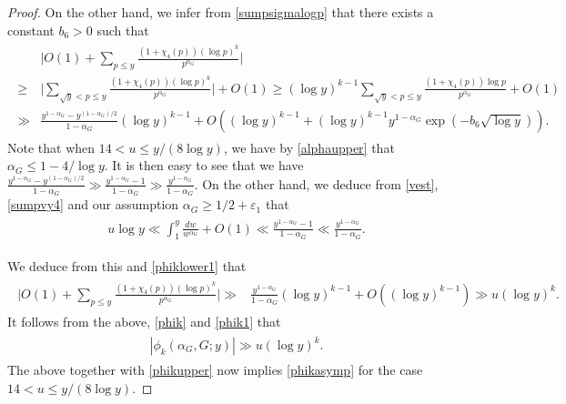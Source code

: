\documentclass[10pt,a4paper]{amsart}
\begin{document}
\begin{proof}
  On the other hand, we infer from \eqref{sumpsigmalogp} that there exists a constant $b_6>0$ such that
\begin{align}
\label{phiklower1}
\begin{split}
  & \Big|O(1)+\sum_{p \leq y}\frac {(1+\chi_4(p))(\log p)^k}{p^{\alpha_G}}\Big | \\
\geq & \Big |\sum_{\sqrt{y} < p \leq y}\frac {(1+\chi_4(p))(\log p)^k}{p^{\alpha_G}}\Big |+O(1)
  \geq (\log y)^{k-1} \sum_{\sqrt{y} < p \leq y}\frac {(1+\chi_4(p))\log p}{p^{\alpha_G}}+O(1) \\
  \gg &  \frac {y^{1-\alpha_G}-y^{(1-\alpha_G)/2}}{1-\alpha_G}(\log y)^{k-1} +O((\log y)^{k-1} +(\log y)^{k-1}y^{1-\alpha_G}\exp(-b_6\sqrt{\log y})). 
\end{split}
\end{align}      
   Note that when $14 < u \leq y/(8\log y)$, we have by \eqref{alphaupper} that $\alpha_G \leq 1-4/\log y$. It is then easy to see that we have $\frac {y^{1-\alpha_G}-y^{(1-\alpha_G)/2}}{1-\alpha_G} \gg \frac {y^{1-\alpha_G}-1}{1-\alpha_G} \gg \frac {y^{1-\alpha_G}}{1-\alpha_G} $. On the other hand, we deduce from \eqref{vest}, \eqref{sumpvy4} and our assumption $\alpha_G \geq 1/2+\varepsilon_1$ that 
\begin{align*}
\begin{split}
 u \log y \ll \int^y_1\frac {dw}{w^{\alpha_G}}+O(1) \ll \frac {y^{1-\alpha_G}-1}{1-\alpha_G} \ll \frac {y^{1-\alpha_G}}{1-\alpha_G}. 
\end{split}
\end{align*}      

   We deduce from this and \eqref{phiklower1} that 
\begin{align*}
\begin{split}
  \Big|O(1)+\sum_{p \leq y}\frac {(1+\chi_4(p))(\log p)^k}{p^{\alpha_G}}\Big | 
  \gg &  \frac {y^{1-\alpha_G}}{1-\alpha_G}(\log y)^{k-1}+O((\log y)^{k-1}) \gg u(\log y)^{k}. 
\end{split}
\end{align*}      
    It follows from the above, \eqref{phik} and \eqref{phik1} that 
\begin{align}
\label{phiklower}
\begin{split}
  |\phi_k(\alpha_G,G;y)| \gg u(\log y)^{k}.
\end{split}
\end{align}    
  The above together with \eqref{phikupper} now implies \eqref{phikasymp} for the case $14 < u \leq y/(8\log y)$. 
  

\end{proof}
\end{document}
